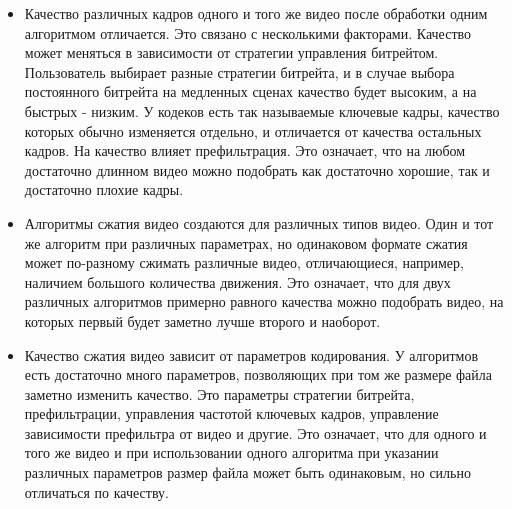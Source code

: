 \begin{itemize}
\item Качество различных кадров одного и того же видео после обработки одним алгоритмом отличается.
Это связано с несколькими факторами. Качество может меняться в зависимости от стратегии управления битрейтом. 
Пользователь выбирает разные стратегии битрейта, и в случае выбора постоянного битрейта
на медленных сценах качество будет высоким, а на быстрых - низким. У кодеков есть так называемые 
ключевые кадры, качество которых обычно изменяется отдельно, и отличается от качества остальных кадров. 
На качество влияет префильтрация. Это означает, что на любом достаточно длинном видео можно подобрать 
как достаточно хорошие, так и достаточно плохие кадры. 

\item Алгоритмы сжатия видео создаются для различных типов видео.
Один и тот же алгоритм при различных параметрах, но одинаковом формате сжатия может по-разному сжимать различные видео, отличающиеся, например, наличием большого 
количества движения. Это означает, что для двух различных алгоритмов примерно равного качества можно подобрать видео, на которых первый будет заметно лучше второго и наоборот.

\item Качество сжатия видео зависит от параметров кодирования. 
У алгоритмов есть достаточно много параметров, позволяющих при том же размере файла заметно изменить качество. Это параметры стратегии битрейта, префильтрации, управления частотой ключевых кадров, управление зависимости префильтра от видео и другие. Это означает, что для одного и того же видео и при использовании одного алгоритма при указании различных параметров размер файла может быть одинаковым, но сильно отличаться по качеству.

\end{itemize}

